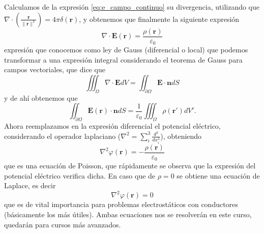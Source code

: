 \documentclass[11pt,a4paper]{article}
\numberwithin{equation}{section}
\begin{document}
Calculamos de la expresión \ref{eq:e_campo_continuo} su divergencia, utilizando que $\nabla \cdot \left(\frac{\textbf{r}}{\|\textbf{r}\|^3}\right) = 4\pi\delta(\textbf{r})$, y obtenemos que finalmente la siguiente expresión
\begin{equation}
    \nabla \cdot \textbf{E}(\textbf{r}) = \frac{\rho(\textbf{r})}{\varepsilon_0}
    \label{eq:e_gauss_dif}
\end{equation}
expresión que conocemos como ley de Gauss (diferencial o local) que podemos transformar a una expresión integral considerando el teorema de Gauss para campos vectoriales, que dice que \[\iiint_{\Omega} \nabla \cdot \textbf{E} dV = \iint_{\partial \Omega} \textbf{E} \cdot \textbf{n} dS\] y de ahí obtenemos que 
\begin{equation}
    \iint_{\partial \Omega} \textbf{E}(\textbf{r}) \cdot \textbf{n} dS = \frac{1}{\varepsilon_0} \iiint_{\Omega} \rho(\textbf{r}') dV'.
    \label{eq:e_gauss_int}
\end{equation}
Ahora reemplazamos en la expresión diferencial el potencial eléctrico, considerando el operador laplaciano ($\displaystyle\nabla^2 = \sum_{i}^3 \frac{d^2}{dx_i^2}$), obteniendo
\begin{equation}
    \nabla^2 \varphi(\textbf{r}) = -\frac{\rho(\textbf{r})}{\varepsilon_0}
    \label{eq:e_poisson}
\end{equation}
que es una ecuación de Poisson, que rápidamente se observa que la expresión del potencial eléctrico verifica dicha. En caso que de $\rho = 0$ se obtiene una ecuación de Laplace, es decir
\begin{equation}
    \nabla^2 \varphi(\textbf{r}) = 0
    \label{eq:e_laplace}
\end{equation}
que es de vital importancia para problemas electrostáticos con conductores (básicamente los más útiles). Ambas ecuaciones nos se resolverán en este curso, quedarán para cursos más avanzados.
\end{document}
